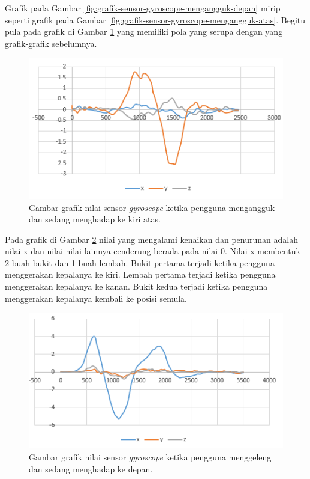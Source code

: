 Grafik pada Gambar \ref{fig:grafik-sensor-gyroscope-mengangguk-depan} mirip seperti grafik pada Gambar \ref{fig:grafik-sensor-gyroscope-mengangguk-atas}. Begitu pula pada grafik di Gambar \ref{fig:grafik-sensor-gyroscope-mengangguk-kiri-atas} yang memiliki pola yang serupa dengan yang grafik-grafik sebelumnya.

\begin{figure}[htbp]
\centering
\includegraphics[scale=1]{Gambar/grafik-sensor-gyroscope-mengangguk-kiri-atas.png}
\caption{Gambar grafik nilai sensor \textit{gyroscope} ketika pengguna mengangguk dan sedang menghadap ke kiri atas.} 
\label{fig:grafik-sensor-gyroscope-mengangguk-kiri-atas}
\end{figure}

Pada grafik di Gambar \ref{fig:grafik-sensor-gyroscope-menggeleng-depan} nilai yang mengalami kenaikan dan penurunan adalah nilai x dan nilai-nilai lainnya cenderung berada pada nilai 0. Nilai x membentuk 2 buah bukit dan 1 buah lembah. Bukit pertama terjadi ketika pengguna menggerakan kepalanya ke kiri. Lembah pertama terjadi ketika pengguna menggerakan kepalanya ke kanan. Bukit kedua terjadi ketika pengguna menggerakan kepalanya kembali ke posisi semula.

\begin{figure}[htbp]
\centering
\includegraphics[scale=1]{Gambar/grafik-sensor-gyroscope-menggeleng-depan.png}
\caption{Gambar grafik nilai sensor \textit{gyroscope} ketika pengguna menggeleng dan sedang menghadap ke depan.} 
\label{fig:grafik-sensor-gyroscope-menggeleng-depan}
\end{figure}

